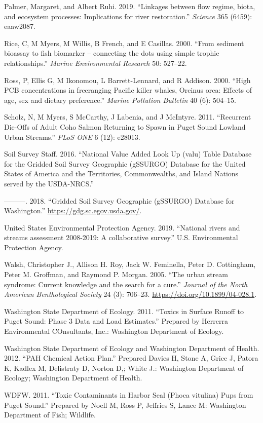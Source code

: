 \documentclass[
]{report}
\begin{document}
\leavevmode\hypertarget{ref-Palmer2019}{}%
Palmer, Margaret, and Albert Ruhi. 2019. ``Linkages between flow regime, biota, and ecosystem processes: Implications for river restoration.'' \emph{Science} 365 (6459): eaaw2087.

\leavevmode\hypertarget{ref-Rice2000}{}%
Rice, C, M Myers, M Willis, B French, and E Casillas. 2000. ``From sediment bioassay to fish biomarker -- connecting the dots using simple trophic relationships.'' \emph{Marine Environmental Research} 50: 527--22.

\leavevmode\hypertarget{ref-Ross2000}{}%
Ross, P, Ellis G, M Ikonomou, L Barrett-Lennard, and R Addison. 2000. ``High PCB concentrations in freeranging Pacific killer whales, Orcinus orca: Effects of age, sex and dietary preference.'' \emph{Marine Pollution Bulletin} 40 (6): 504--15.

\leavevmode\hypertarget{ref-Scholz2011}{}%
Scholz, N, M Myers, S McCarthy, J Labenia, and J McIntyre. 2011. ``Recurrent Die-Offs of Adult Coho Salmon Returning to Spawn in Puget Sound Lowland Urban Streams.'' \emph{PLoS ONE} 6 (12): e28013.

\leavevmode\hypertarget{ref-SoilSurveyStaff2016}{}%
Soil Survey Staff. 2016. ``National Value Added Look Up (valu) Table Database for the Gridded Soil Survey Geographic (gSSURGO) Database for the United States of America and the Territories, Commonwealths, and Island Nations served by the USDA-NRCS.''

\leavevmode\hypertarget{ref-SoilSurveyStaff2018}{}%
---------. 2018. ``Gridded Soil Survey Geographic (gSSURGO) Database for Washington.'' \url{https://gdg.sc.egov.usda.gov/}.

\leavevmode\hypertarget{ref-USEPA2019}{}%
United States Environmental Protection Agency. 2019. ``National rivers and streams assessment 2008-2019: A collaborative survey.'' U.S. Environmental Protection Agency.

\leavevmode\hypertarget{ref-Walsh2005}{}%
Walsh, Christopher J., Allison H. Roy, Jack W. Feminella, Peter D. Cottingham, Peter M. Groffman, and Raymond P. Morgan. 2005. ``The urban stream syndrome: Current knowledge and the search for a cure.'' \emph{Journal of the North American Benthological Society} 24 (3): 706--23. \url{https://doi.org/10.1899/04-028.1}.

\leavevmode\hypertarget{ref-WashingtonStateDepartmentofEcology2011}{}%
Washington State Department of Ecology. 2011. ``Toxics in Surface Runoff to Puget Sound: Phase 3 Data and Load Estimates.'' Prepared by Herrerra Environmental COnsultants, Inc.: Washington Department of Ecology.

\leavevmode\hypertarget{ref-WashingtonStateDepartmentofEcologyandWashingtonDepartmentofHealth2012}{}%
Washington State Department of Ecology and Washington Department of Health. 2012. ``PAH Chemical Action Plan.'' Prepared Davies H, Stone A, Grice J, Patora K, Kadlex M, Delistraty D, Norton D,; White J.: Washington Department of Ecology; Washington Department of Health.

\leavevmode\hypertarget{ref-WDFW2011}{}%
WDFW. 2011. ``Toxic Contaminants in Harbor Seal (Phoca vitulina) Pups from Puget Sound.'' Prepared by Noell M, Ross P, Jeffries S, Lance M: Washington Department of Fish; Wildlife.
\end{document}
